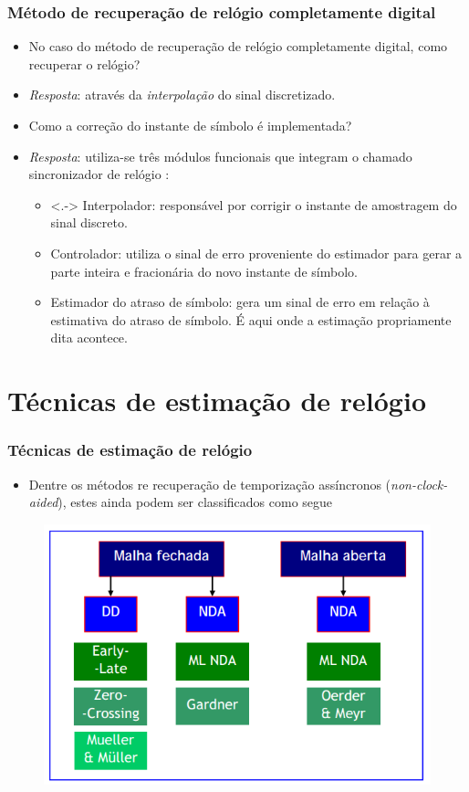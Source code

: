 \begin{frame}[t]
    \frametitle{Método de recuperação de relógio completamente digital}
    \begin{itemize}[<+->]
        \item No caso do método de recuperação de relógio completamente digital, como recuperar o relógio?
        \item \emph{Resposta}: através da \emph{interpolação} do sinal discretizado.
        \item Como a correção do instante de símbolo é implementada?
        \item \emph{Resposta}: utiliza-se três módulos funcionais que integram o chamado sincronizador de relógio \cite{abrantes2010recuperaccao}:
            \begin{itemize}
                \item<.-> Interpolador: responsável por corrigir o instante de amostragem do sinal discreto.
                \item Controlador: utiliza o sinal de erro proveniente do estimador para gerar a parte inteira e fracionária do novo instante de símbolo.
                \item Estimador do atraso de símbolo: gera um sinal de erro em relação à estimativa do atraso de símbolo. É aqui onde a estimação propriamente dita acontece.
            \end{itemize}
    \end{itemize}
\end{frame}

\section{Técnicas de estimação de relógio}
\begin{frame}[t]
	\frametitle{Técnicas de estimação de relógio}
    \begin{itemize}
        \item Dentre os métodos re recuperação de temporização assíncronos (\textit{non-clock-aided}), estes ainda podem ser classificados como segue
    \end{itemize}
    \begin{figure}
        \includegraphics[scale=.45]{figs/tecnicas_estimacao.png}
    \end{figure}
\end{frame}

